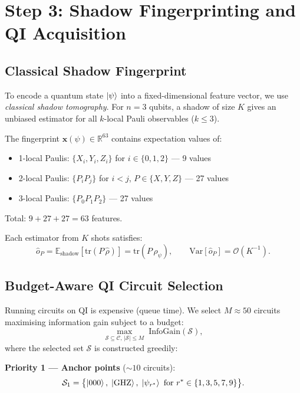 \documentclass[11pt,a4paper]{article}
\begin{document}
\section{Step 3: Shadow Fingerprinting and QI Acquisition}\label{sec:shadow}

\subsection{Classical Shadow Fingerprint}

To encode a quantum state $\ket{\psi}$ into a fixed-dimensional feature vector, we use
\emph{classical shadow tomography}. For $n=3$ qubits, a shadow of size $K$ gives an
unbiased estimator for all $k$-local Pauli observables ($k \leq 3$).

The fingerprint $\mathbf{x}(\psi) \in \mathbb{R}^{63}$ contains expectation values of:
\begin{itemize}
    \item 1-local Paulis: $\{X_i, Y_i, Z_i\}$ for $i \in \{0,1,2\}$ — 9 values
    \item 2-local Paulis: $\{P_i P_j\}$ for $i < j$, $P \in \{X,Y,Z\}$ — 27 values
    \item 3-local Paulis: $\{P_0 P_1 P_2\}$ — 27 values
\end{itemize}
Total: $9 + 27 + 27 = 63$ features.

Each estimator from $K$ shots satisfies:
\begin{equation}
    \hat{o}_P = \mathbb{E}_{\text{shadow}}\!\left[\mathrm{tr}(P\,\hat{\rho})\right]
    = \mathrm{tr}(P\,\rho_\psi), \qquad
    \mathrm{Var}[\hat{o}_P] = \mathcal{O}(K^{-1}).
\end{equation}

\subsection{Budget-Aware QI Circuit Selection}

Running circuits on QI is expensive (queue time). We select $M \approx 50$ circuits
maximising information gain subject to a budget:
\begin{equation}
    \max_{\mathcal{S} \subseteq \mathcal{C},\, |\mathcal{S}| \leq M}
    \;\mathrm{InfoGain}(\mathcal{S}),
\end{equation}
where the selected set $\mathcal{S}$ is constructed greedily:

\medskip
\textbf{Priority 1 — Anchor points} ($\sim 10$ circuits):
\begin{equation}
    \mathcal{S}_1 = \bigl\{\ket{000},\; \ket{\mathrm{GHZ}},\;
    \ket{\psi_{r^*}} \text{ for } r^* \in \{1, 3, 5, 7, 9\}\bigr\}.
\end{equation}
\end{document}
